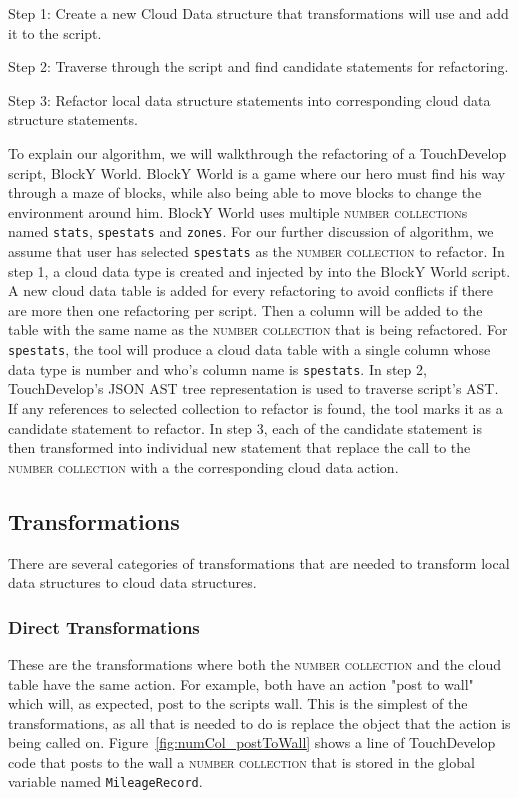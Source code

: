 \documentclass{sigplanconf}
\begin{document}
Step 1: Create a new Cloud Data structure that transformations will use and add it to the script.

Step 2: Traverse through the script and find candidate statements for refactoring.

Step 3: Refactor local data structure statements into corresponding cloud data structure statements.

To explain our algorithm, we will walkthrough the refactoring of a TouchDevelop script, BlockY World.  BlockY World is a game where our hero must find his way through a maze of blocks, while also being able to move blocks to change the environment around him.  BlockY World uses multiple \textsc{number collection}s named \texttt{stats}, \texttt{spestats} and \texttt{zones}. For our further discussion of algorithm, we assume that user has selected \texttt{spestats} as the \textsc{number collection} to refactor. In step 1, a cloud data type is created and injected by \tool into the BlockY World script.  A new cloud data table is added for every refactoring to avoid conflicts if there are more then one refactoring per script. Then a column will be added to the table with the same name as the \textsc{number collection} that is being refactored.  For \texttt{spestats}, the tool will produce a cloud data table with a single column whose data type is number and who's column name is \texttt{spestats}.  In step 2, TouchDevelop's JSON AST tree representation is used to traverse script's AST. If any references to selected collection to refactor is found, the tool marks it as a candidate statement to refactor.  In step 3, each of the candidate statement is then transformed into individual new statement that replace the call to the \textsc{number collection} with a the corresponding cloud data action. 

\subsection{Transformations}
There are several categories of transformations that are needed to transform local data structures to cloud data structures.  


\subsubsection{Direct Transformations}
These are the transformations where both the \textsc{number collection} and the cloud table have the same action.  For example, both have an action "post to wall" which will, as expected, post to the scripts wall.  This is the simplest of the transformations, as all that is needed to do is replace the object that the action is being called on.  Figure~\ref{fig:numCol_postToWall} shows a line of TouchDevelop code that posts to the wall a \textsc{number collection} that is stored in the global variable named \texttt{MileageRecord}.
\end{document}
